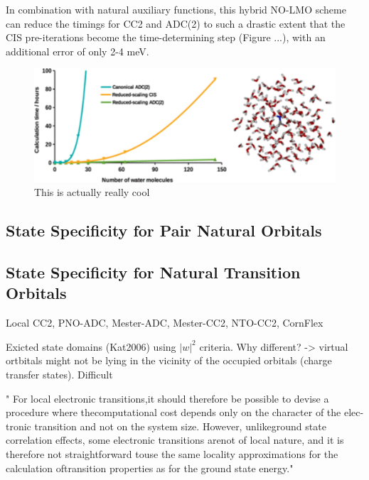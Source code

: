 In combination with natural auxiliary functions, this hybrid NO-LMO scheme can reduce the timings for CC2 and ADC(2) to such a drastic extent that the CIS pre-iterations become the time-determining step (Figure ...), with an additional error of only 2-4 meV. 

\begin{figure}
\centering
\includegraphics[scale=1.0]{Pics/mester_adc.png}
\caption{This is actually really cool}
\end{figure}


\subsection{State Specificity for Pair Natural Orbitals}

\subsection{State Specificity for Natural Transition Orbitals} 

Local CC2, PNO-ADC, Mester-ADC, Mester-CC2, NTO-CC2, CornFlex

Exicted state domains (Kat2006) using $|w|^2$ criteria. Why different? -> virtual ortbitals might not be lying in the vicinity of the occupied orbitals (charge transfer states). Difficult 

" For local electronic transitions,it should therefore be possible to devise a procedure where thecomputational cost depends only on the character of the elec-tronic transition and not on the system size. However, unlikeground state correlation effects, some electronic transitions arenot of local nature, and it is therefore not straightforward touse  the  same  locality  approximations  for  the  calculation  oftransition properties as for the ground state energy."

